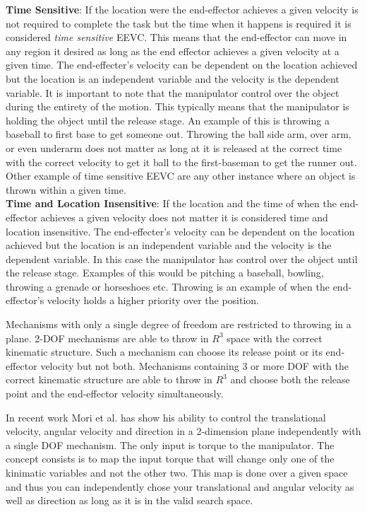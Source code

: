 \noindent \textbf{Time Sensitive}: 
If the location were the end-effector achieves a given velocity is not required to complete the task but the time when it happens is required it is considered \textit{time sensitive} EEVC. 
This means that the end-effector can move in any region it desired as long as the end effector achieves a given velocity at a given time.
The end-effecter's velocity can be dependent on the location achieved but the location is an independent variable and the velocity is the dependent variable.
It is important to note that the manipulator control over the object during the entirety of the motion.
This typically means that the manipulator is holding the object until the release stage.
An example of this is throwing a baseball to first base to get someone out.
Throwing the ball side arm, over arm, or even underarm does not matter as long at it is released at the correct time with the correct velocity to get it ball to the first-baseman to get the runner out.
Other example of time sensitive EEVC are any other instance where an object is thrown within a given time. \\




\noindent \textbf{Time and Location Insensitive}:
If the location and the time of when the end-effector achieves a given velocity does not matter it is considered time and location insensitive.  
The end-effecter's velocity can be dependent on the location achieved but the location is an independent variable and the velocity is the dependent variable.
In this case the manipulator has control over the object until the release stage.
Examples of this would be pitching a baseball, bowling, throwing a grenade or horseshoes etc.
Throwing is an example of when the end-effector's velocity holds a higher priority over the position.  


Mechanisms with only a single degree of freedom are restricted to throwing in a plane.   2-DOF mechanisms are able to throw in $R^3$ space with the correct kinematic structure.
Such a mechanism can choose its release point or its end-effector velocity but not both.
Mechanisms containing 3 or more DOF with the correct kinematic structure are able to throw in $R^3$ and choose both the release point and the end-effector velocity simultaneously. 

In recent work Mori et al. \cite{5152525} has show his ability to control the translational velocity, angular velocity and direction in a 2-dimension plane independently with a single DOF mechanism.
The only input is torque to the manipulator.
The concept consists is to map the input torque that will change only one of the kinimatic variables and not the other two.
This map is done over a given space and thus you can independently chose your translational and angular velocity as well as direction as long as it is in the valid search space.

